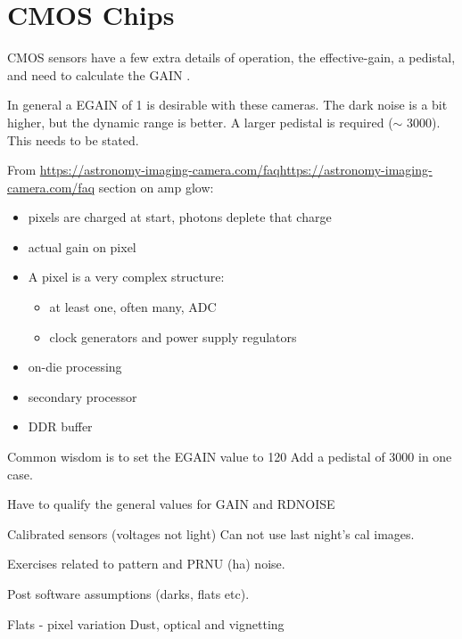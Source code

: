 \section{CMOS Chips}

CMOS sensors have a few extra details of operation, the
effective-gain, a pedistal, and need to
calculate the GAIN .

In general a EGAIN of 1 is desirable with these cameras. The dark
noise is a bit higher, but the dynamic range 
is better. A larger pedistal is required ($\sim$ 3000). This needs
to be stated.


From \url{https://astronomy-imaging-camera.com/faqhttps://astronomy-imaging-camera.com/faq} section on amp glow:

\begin{itemize}
\addtolength{\itemsep}{-0.5\baselineskip}
   \item   pixels are charged at start, photons deplete that charge
   \item   actual gain on pixel
   \item   A pixel is a very complex structure:
\begin{itemize}
\addtolength{\itemsep}{-0.5\baselineskip}
   \item   at least one, often many, ADC
   \item   clock generators and power supply regulators
\end{itemize}
   \item   on-die processing
   \item   secondary processor
   \item   DDR buffer
\end{itemize}

Common wisdom is to set the EGAIN value to 120
Add a pedistal of 3000 in one case.


Have to qualify the general values for GAIN and RDNOISE

Calibrated sensors (voltages not light)
Can not use last night's cal images.

Exercises related to pattern and PRNU (ha) noise.

Post software assumptions (darks, flats etc).

Flats - pixel variation
        Dust, optical and vignetting



 

